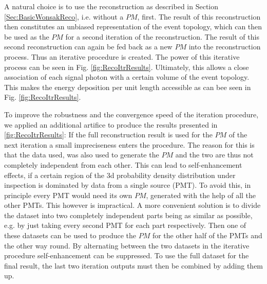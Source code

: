   A natural choice is to use the reconstruction as described in Section \ref{Sec:BasicWonsakReco}, i.e. without a $PM$, first. The result
  of this reconstruction then constitutes an unbiased representation of the event topology, which can then be used as the $PM$ for a second
  iteration of the reconstruction. The result of this second reconstruction can again be fed back as a new $PM$ into the reconstruction 
  process. Thus an iterative procedure is created. The power of this iterative process can be seen in Fig. \ref{fig:RecoItrResults}. Ultimately, this allows
  a close association of each signal photon with a certain volume of the event topology. This makes the energy deposition per unit length 
  accessible as can bee seen in Fig. \ref{fig:RecoItrResults}. 
  
  To improve the robustness and the convergence speed of the iteration procedure, we applied an additional artifice to produce the results 
  presented in \ref{fig:RecoItrResults}: If the full reconstruction result is used for the $PM$ of the next iteration a small impreciseness enters the 
  procedure. The reason for this is that the data used, was also used to generate the $PM$ and the two are thus not completely independent
  from each other. This can lead to self-enhancement effects, if a certain region of the 3d probability density distribution under 
  inspection is dominated by data from a single source (PMT). To avoid this, in principle every PMT would need its own $PM$, generated with
  the help of all the other PMTs. This however is impractical. A more convenient solution is to divide the dataset into two completely 
  independent parts being as similar as possible, e.g. by just taking every second PMT for each part respectively. Then one of these 
  datasets can be used to produce the $PM$ for the other half of the PMTs and the other way round. By alternating between the
  two datasets in the iterative procedure self-enhancement can be suppressed. To use the full dataset for the final result, the last two
  iteration outputs must then be combined by adding them up.
